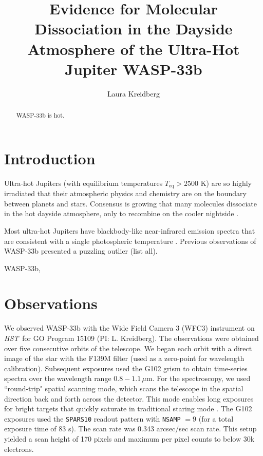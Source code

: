 \documentclass[twocolumn]{aastex62}
\newcommand{\project}[1]{\textsl{#1}}
\newcommand{\HST}{\project{HST}}
\begin{document}
\title{Evidence for Molecular Dissociation in the Dayside Atmosphere of the Ultra-Hot Jupiter WASP-33b}

\author{Laura Kreidberg}

\begin{abstract}
WASP-33b is hot.
\end{abstract}


\section{Introduction} \label{sec:intro}
Ultra-hot Jupiters (with equilibrium temperatures $T_\mathrm{eq} > 2500$ K) are so highly irradiated that their atmospheric physics and chemistry are on the boundary between planets and stars. Consensus is growing that many molecules dissociate in the hot dayside atmosphere, only to recombine on the cooler nightside \citep{arcangeli18, parmentier18, lothringer18}. 

Most ultra-hot Jupiters have blackbody-like near-infrared emission spectra that are consistent with a single photospheric temperature \citep{arcangeli18, kreidberg18b, mansfield18}.
Previous observations of WASP-33b presented a puzzling outlier (list all).

WASP-33b, \citep[a gas giant in a 1.22 day orbit around a $\delta$ Scuti star][]{cameron10} 

\section{Observations} \label{sec:observations}
We observed WASP-33b with the Wide Field Camera 3 (WFC3) instrument on \HST\ for GO Program 15109 (PI: L. Kreidberg). The observations were obtained over five consecutive orbits of the telescope. We began each orbit with a direct image of the star with the F139M filter (used as a zero-point for wavelength calibration). Subsequent exposures used the G102 grism to obtain time-series spectra over the wavelength range $0.8 - 1.1\,\mu$m. For the spectroscopy, we used ``round-trip" spatial scanning mode, which scans the telescope in the spatial direction back and forth across the detector. This mode enables long exposures for bright targets that quickly saturate in traditional staring mode \citep[compare][]{berta12, kreidberg14a}.  The G102 exposures used the \texttt{SPARS10} readout pattern with \texttt{NSAMP} $= 9$ (for a total exposure time of 83 s). The scan rate was 0.343 arcsec/sec scan rate. This setup yielded a scan height of 170 pixels and maximum per pixel counts to below 30k electrons. 
\end{document}
